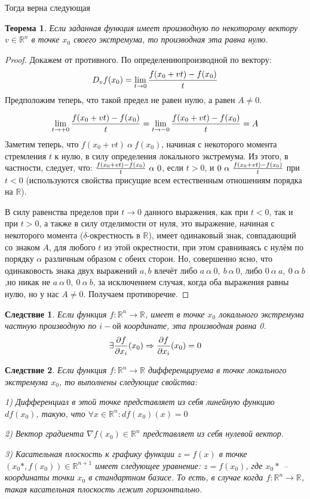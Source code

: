 \documentclass[20pt,a4paper]{extarticle}
\newtheorem*{theorem}{Теорема}
\newtheorem{consequence}{Следствие}
\newtheorem*{proof}{Доказательство}
\begin{document}
Тогда верна следующая
\begin{theorem}
Если заданная функция имеет производную по некоторому вектору $v \in \mathbb{R}^n$ в точке $x_0$ своего экстремума, то производная эта равна нулю.
\end{theorem}
\begin{proof}


Докажем от противного. 
По определению\linebreak производной по вектору:
$$D_{v}f(x_0) = \lim_{t \to 0}{f(x_0 + vt)-f(x_0) \over t}$$
Предположим теперь, что такой предел не равен нулю, а равен $A \not = 0$.

$$ \lim_{t \to +0}{f(x_0 + vt)-f(x_0) \over t} = \lim_{t \to -0}{f(x_0 + vt)-f(x_0) \over t}=A$$
Заметим теперь, что $f(x_0 +vt)\ \alpha\  f(x_0)$, начиная с некоторого момента стремления $t$ к нулю, в силу определения локального экстремума.
Из этого, в частности, следует, что: ${f(x_0 + vt)-f(x_0) \over t}\ \alpha\ 0$, если $t>0$, и  $0\ \alpha\ {f(x_0 + vt)-f(x_0) \over t}$ при $t<0$ (используются свойства присущие всем естественным отношениям порядка на $\mathbb{R}$).

В силу равенства пределов при $t\to 0$ данного выражения, как при $t<0$, так и при $t>0$, а также в силу отделимости от нуля, это выражение, начиная с некоторого момента ($\delta$-окрестность в $\mathbb{R}$), имеет одинаковый знак, совпадающий со знаком $A$, для любого $t$ из этой окрестности, при этом сравниваясь с нулём по порядку $\alpha$ различным образом с обеих сторон. Но, совершенно ясно, что одинаковость знака двух выражений $a,b$ влечёт либо $a\ \alpha\ 0,\ b\ \alpha\ 0$, либо $0\ \alpha\ a,\ 0\ \alpha\ b$,но никак не $a\ \alpha\ 0,\ 0\ \alpha\ b$, за исключением случая, когда оба выражения равны нулю, но у нас $A \not =0$. Получаем противоречие.
\end{proof}
\begin{consequence}
Если функция $f: \mathbb{R}^n \to \mathbb{R}$, имеет в точке $x_0$ локального экстремума частную производную по $i-ой$ координате, эта производная равна 0.$$\exists {\partial f \over \partial x_i}(x_0) \Rightarrow {\partial f \over \partial x_i}(x_0) = 0$$
\end{consequence}
\begin{consequence}
Если функция $f: \mathbb{R}^n \to \mathbb{R}$ дифференцируема в точке  локального экстремума $x_0$, то выполнены следующие свойства: 

1) Дифференциал в этой точке представляет из себя линейную функцию $df(x_0)$, такую, что $\forall x \in \mathbb{R}^n: df(x_0)(x) = 0$ 

2) Вектор градиента $\nabla f(x_0) \in \mathbb{R}^n$ представляет из себя нулевой вектор. 

3) Касательная плоскость к графику функции $z = f(x)$ в точке $(x_0*,f(x_0)) \in \mathbb{R}^{n+1}$ имеет следующее уравнение: $z = f(x_0)$, где $x_0*$ -- координаты точки $x_0$ в стандартном базисе. То есть, в случае когда $f: \mathbb{R}^n \to \mathbb{R}$, такая касательная плоскость лежит горизонтально.
\end{consequence}
\end{document}
